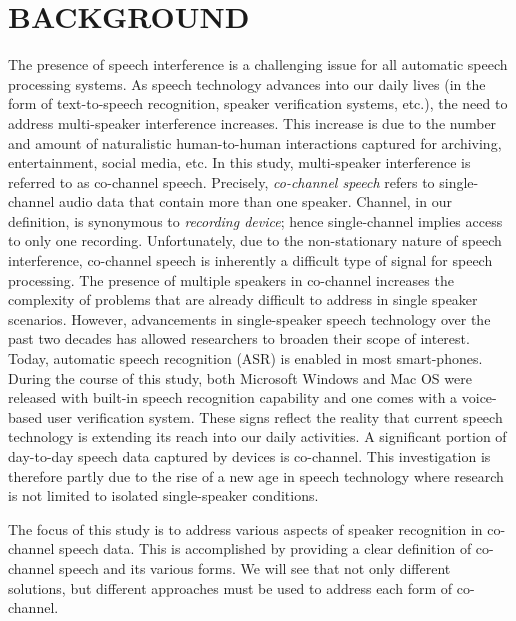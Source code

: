 
\chapter{BACKGROUND}
\label{chap:intro}
 
The presence of speech interference is a challenging issue for all automatic speech processing systems. 
As speech technology advances into our daily lives (in the form of text-to-speech recognition, speaker verification systems, etc.), the need to address multi-speaker interference increases. 
This increase is due to the number and amount of naturalistic human-to-human interactions captured for archiving, entertainment, social media, etc. 
In this study, multi-speaker interference is referred to as co-channel speech. 
Precisely, {\it co-channel speech} refers to single-channel audio data that contain more than one speaker. 
Channel, in our definition, is synonymous to {\it recording device}; hence single-channel implies access to only one recording. 
Unfortunately, due to the non-stationary nature of speech interference, co-channel speech is inherently a difficult type of signal for speech processing. 
The presence of multiple speakers in co-channel increases the complexity of problems that are already difficult to address in single speaker scenarios. 
However, advancements in single-speaker speech technology over the past two decades has allowed researchers to broaden their scope of interest. 
Today, automatic speech recognition (ASR) is enabled in most smart-phones. 
During the course of this study, both Microsoft Windows and Mac OS were released with built-in speech recognition capability and one comes with a voice-based user verification system. 
These signs reflect the reality that current speech technology is extending its reach into our daily activities. 
A significant portion of day-to-day speech data captured by devices is co-channel. 
This investigation is therefore partly due to the rise of a new age in speech technology where research is not limited to isolated single-speaker conditions. 

The focus of this study is to address various aspects of speaker recognition in co-channel speech data. 
This is accomplished by providing a clear definition of co-channel speech and its various forms. 
We will see that not only different solutions, but different approaches must be used to address each form of co-channel. 





